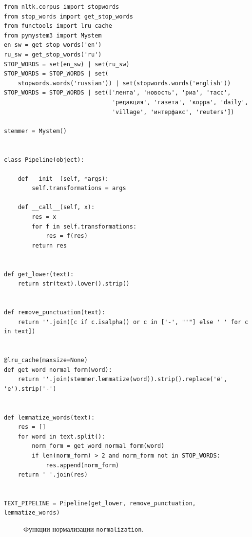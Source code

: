 \documentclass[a4paper, 14pt]{extarticle}
\begin{document}
\begin{verbatim}
from nltk.corpus import stopwords
from stop_words import get_stop_words
from functools import lru_cache
from pymystem3 import Mystem
en_sw = get_stop_words('en')
ru_sw = get_stop_words('ru')
STOP_WORDS = set(en_sw) | set(ru_sw)
STOP_WORDS = STOP_WORDS | set(
    stopwords.words('russian')) | set(stopwords.words('english'))
STOP_WORDS = STOP_WORDS | set(['лента', 'новость', 'риа', 'тасс',
                               'редакция', 'газета', 'корра', 'daily',
                               'village', 'интерфакс', 'reuters'])

stemmer = Mystem()


class Pipeline(object):

    def __init__(self, *args):
        self.transformations = args

    def __call__(self, x):
        res = x
        for f in self.transformations:
            res = f(res)
        return res


def get_lower(text):
    return str(text).lower().strip()


def remove_punctuation(text):
    return ''.join([c if c.isalpha() or c in ['-', "'"] else ' ' for c in text])


@lru_cache(maxsize=None)
def get_word_normal_form(word):
    return ''.join(stemmer.lemmatize(word)).strip().replace('ё', 'е').strip('-')


def lemmatize_words(text):
    res = []
    for word in text.split():
        norm_form = get_word_normal_form(word)
        if len(norm_form) > 2 and norm_form not in STOP_WORDS:
            res.append(norm_form)
    return ' '.join(res)


TEXT_PIPELINE = Pipeline(get_lower, remove_punctuation, lemmatize_words)
\end{verbatim}
\begin{figure}[H]
	\caption{Функции нормализации \texttt{normalization}.}
	\label{normal}
\end{figure}
\end{document}
